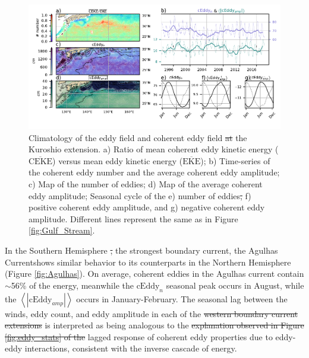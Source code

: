 \documentclass[draft,linenumbers]{agujournal2019}
\newcommand{\MEKE}{\overline{\textrm{EKE}}}
\newcommand{\MCEKE}{\overline{\textrm{CEKE}}}
\newcommand{\cEddy}{\textrm{cEddy}}
\providecommand{\DIFadd}[1]{{\protect\color{blue}\uwave{#1}}} %
\providecommand{\DIFdel}[1]{{\protect\color{red}\sout{#1}}}                      %
\providecommand{\DIFaddbegin}{} %
\providecommand{\DIFaddend}{} %
\providecommand{\DIFdelbegin}{} %
\providecommand{\DIFdelend}{} %
\providecommand{\DIFaddFL}[1]{\DIFadd{#1}} %
\providecommand{\DIFdelFL}[1]{\DIFdel{#1}} %
\providecommand{\DIFaddbeginFL}{} %
\providecommand{\DIFaddendFL}{} %
\providecommand{\DIFdelbeginFL}{} %
\providecommand{\DIFdelendFL}{} %
\begin{document}
	\begin{figure}
	    \centering
	    \includegraphics[width=1\textwidth]{figures/regional_ratios_and_stats_V3_4.pdf}
	    \caption{Climatology of the eddy field and coherent eddy field \DIFdelbeginFL \DIFdelFL{at }\DIFdelendFL \DIFaddbeginFL \DIFaddFL{in }\DIFaddendFL the Kuroshio extension. a) Ratio of mean coherent eddy kinetic energy ($\MCEKE$) versus mean eddy kinetic energy ($\MEKE$); b) Time-series of the coherent eddy number and the average coherent eddy amplitude; c) Map of the number of eddies; d) Map of the average coherent eddy amplitude; Seasonal cycle of the e) number of eddies\DIFdelbeginFL \DIFdelFL{, }\DIFdelendFL \DIFaddbeginFL \DIFaddFL{; }\DIFaddendFL f) positive coherent eddy amplitude, and g) negative coherent eddy amplitude. Different lines represent the same as in Figure \ref{fig:Gulf_Stream}.}
	    \label{fig:Kuroshio}
	\end{figure}

	In the Southern Hemisphere \DIFdelbegin \DIFdel{, }\DIFdelend the strongest boundary current, the Agulhas Current\DIFaddbegin \DIFadd{, }\DIFaddend shows similar behavior to its counterparts in the Northern Hemisphere (Figure \ref{fig:Agulhas}). On average, coherent eddies in the Agulhas current contain $\sim$56\% of the energy, meanwhile the $\cEddy_{n}$ seasonal peak occurs in August, while the $\left<|\cEddy_{amp}|\right>$ \DIFaddbegin \DIFadd{peak }\DIFaddend occurs in January-February. 
	The seasonal lag between the winds, eddy count, and eddy amplitude in each of the \DIFdelbegin \DIFdel{western boundary current extensions }\DIFdelend \DIFaddbegin \DIFadd{WBCe }\DIFaddend is interpreted as being analogous to the \DIFdelbegin \DIFdel{explanation observed in Figure \ref{fig:eddy_stats} of the }\DIFdelend lagged response of coherent eddy properties \DIFaddbegin \DIFadd{(Figure \ref{fig:eddy_stats}) }\DIFaddend due to eddy-eddy interactions, consistent with the inverse cascade of energy.
\end{document}
